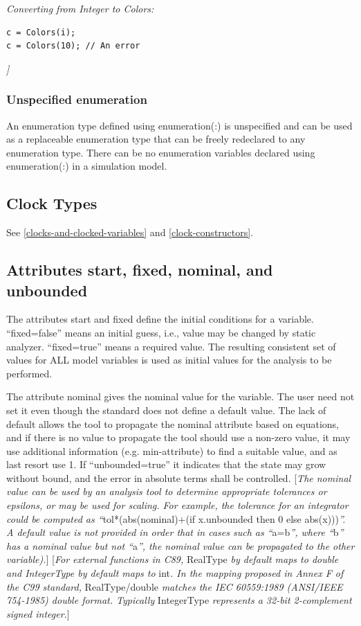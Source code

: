 \documentclass[10pt,a4paper]{report}
\def\doublelabel#1{\label{#1}}
\begin{document}
\emph{Converting from Integer to Colors: }
\begin{lstlisting}[language=Modelica]
c = Colors(i);
c = Colors(10); // An error
\end{lstlisting}

\emph{{]}}

\subsubsection{Unspecified enumeration}\doublelabel{unspecified-enumeration}

An enumeration type defined using enumeration(:) is unspecified and can
be used as a replaceable enumeration type that can be freely redeclared
to any enumeration type. There can be no enumeration variables declared
using enumeration(:) in a simulation model.

\subsection{Clock Types}\doublelabel{clock-types}

See \ref{clocks-and-clocked-variables} and \ref{clock-constructors}.

\subsection{Attributes start, fixed, nominal, and unbounded}\doublelabel{attributes-start-fixed-nominal-and-unbounded}

The attributes start and fixed define the initial conditions for a
variable. ``fixed=false'' means an initial guess, i.e., value may be
changed by static analyzer. ``fixed=true'' means a required value. The
resulting consistent set of values for ALL model variables is used as
initial values for the analysis to be performed.

The attribute nominal gives the nominal value for the variable. The user
need not set it even though the standard does not define a default
value. The lack of default allows the tool to propagate the nominal
attribute based on equations, and if there is no value to propagate the
tool should use a non-zero value, it may use additional information
(e.g. min-attribute) to find a suitable value, and as last resort use 1.
If ``unbounded=true'' it indicates that the state may grow without
bound, and the error in absolute terms shall be controlled. {[}\emph{The
nominal value can be used by an analysis tool to determine appropriate
tolerances or epsilons, or may be used for scaling. For example, the
tolerance for an integrator could be computed as
``}tol*(abs(nominal)+(if x.unbounded then 0 else abs(x)))\emph{''. A
default value is not provided in order that in cases such as
``}a=b\emph{'', where ``}b\emph{'' has a nominal value but not
``}a\emph{'', the nominal value can be propagated to the other
variable).}{]} {[}\emph{For external functions in C89,} RealType
\emph{by default maps to double and IntegerType by default maps to}
int\emph{. In the mapping proposed in Annex F of the C99 standard,}
RealType/double \emph{matches the IEC 60559:1989 (ANSI/IEEE 754-1985)
double format. Typically} IntegerType \emph{represents a 32-bit
2-complement signed integer.}{]}
\end{document}
